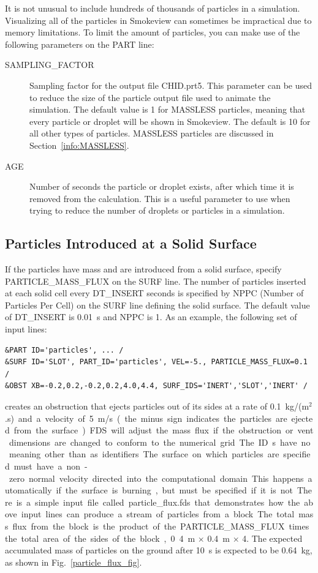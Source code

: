 \documentclass[11pt]{book}
\begin{document}
It is not unusual to include hundreds of thousands of particles in a simulation. Visualizing all of the particles in Smokeview can sometimes be impractical due to memory limitations. To limit the amount of particles, you can make use of the following parameters on the {\ct PART} line:
\begin{description}
\item[{\ct SAMPLING\_FACTOR}] Sampling factor for the output file {\ct CHID.prt5}. This parameter can be used to reduce the size of the particle output file used to animate the simulation. The default value is 1 for {\ct MASSLESS} particles, meaning that every particle or droplet will be shown in Smokeview. The default is 10 for all other types of particles. {\ct MASSLESS} particles are discussed in Section~\ref{info:MASSLESS}.
\item[{\ct AGE}]  Number of seconds the particle or droplet exists, after which time it is removed from the calculation. This is a useful parameter to use when trying to reduce the number of droplets or particles in a simulation.
\end{description}



\subsection{Particles Introduced at a Solid Surface}
\label{info:particle_flux}
\label{particle_flux}

If the particles have mass and are introduced from a solid surface, specify {\ct PARTICLE\_MASS\_FLUX} on the {\ct SURF} line. The number of particles inserted at each solid cell every {\ct DT\_INSERT} seconds is specified by {\ct NPPC} (Number of Particles Per Cell) on the {\ct SURF} line defining the solid surface. The default value of {\ct DT\_INSERT} is 0.01~s and {\ct NPPC} is 1. As an example, the following set of input lines:
\begin{lstlisting}
&PART ID='particles', ... /
&SURF ID='SLOT', PART_ID='particles', VEL=-5., PARTICLE_MASS_FLUX=0.1 /
&OBST XB=-0.2,0.2,-0.2,0.2,4.0,4.4, SURF_IDS='INERT','SLOT','INERT' /
\end{lstlisting}
creates an obstruction that ejects particles out of its sides at a rate of 0.1~\si{kg/(m$^2$.s)} and a velocity of 5~m/s (the minus sign indicates the particles are ejected from the surface). FDS will adjust the mass flux if the obstruction or vent dimensions are changed to conform to the numerical grid. The {\ct ID}s have no meaning other than as identifiers. The surface on which particles are specified must have a non-zero normal velocity directed into the computational domain. This happens automatically if the surface is burning, but must be specified if it is not. There is a simple input file called {\ct particle\_flux.fds} that demonstrates how the above input lines can produce a stream of particles from a block. The total mass flux from the block is the product of the {\ct PARTICLE\_MASS\_FLUX} times the total area of the sides of the block, 0.4~m $\times$ 0.4~m $\times$ 4. The expected accumulated mass of particles on the ground after 10~s is expected to be 0.64~kg, as shown in Fig.~\ref{particle_flux_fig}.
\end{document}
